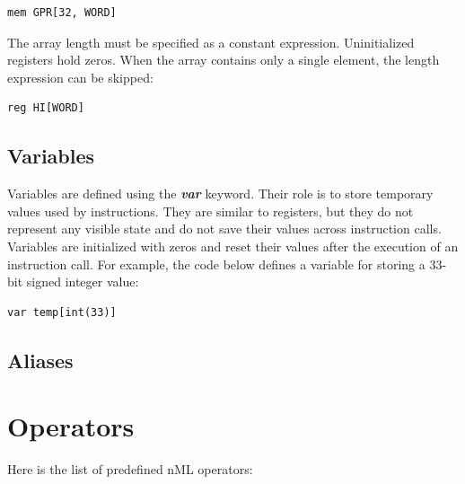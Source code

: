 \documentclass[oneside,final,14pt]{extreport}
\begin{document}
\begin{lstlisting}
mem GPR[32, WORD]
\end{lstlisting}

The array length must be specified as a constant expression. Uninitialized registers hold
zeros. When the array contains only a single element, the length expression can be skipped:

\begin{lstlisting}
reg HI[WORD]
\end{lstlisting}

\subsection{Variables}

Variables are defined using the \textbf{\textit{var}} keyword. Their role is to store
temporary values used by instructions. They are similar to registers, but they do not represent
any visible state and do not save their values across instruction calls. Variables are initialized
with zeros and reset their values after the execution of an instruction call. For example, the code
below defines a variable for storing a 33-bit signed integer value:

\begin{lstlisting}
var temp[int(33)]
\end{lstlisting}


\subsection{Aliases}



\section{Operators}

Here is the list of predefined nML operators:
\end{document}

